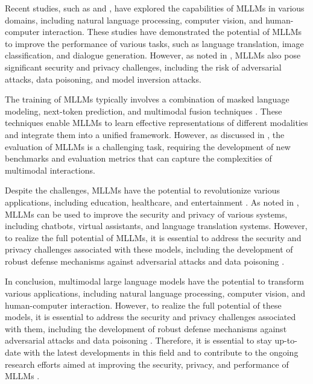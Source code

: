 \documentclass[11pt,a4paper]{article}
\begin{document}
Recent studies, such as \cite{doi:10.18653/v1/2023.acl-long.411} and \cite{arxiv:2401.13601}, have explored the capabilities of MLLMs in various domains, including natural language processing, computer vision, and human-computer interaction. These studies have demonstrated the potential of MLLMs to improve the performance of various tasks, such as language translation, image classification, and dialogue generation. However, as noted in \cite{doi:10.1145/3712001}, MLLMs also pose significant security and privacy challenges, including the risk of adversarial attacks, data poisoning, and model inversion attacks.

The training of MLLMs typically involves a combination of masked language modeling, next-token prediction, and multimodal fusion techniques \cite{arxiv:2403.03627}. These techniques enable MLLMs to learn effective representations of different modalities and integrate them into a unified framework. However, as discussed in \cite{arxiv:2408.08632}, the evaluation of MLLMs is a challenging task, requiring the development of new benchmarks and evaluation metrics that can capture the complexities of multimodal interactions.

Despite the challenges, MLLMs have the potential to revolutionize various applications, including education, healthcare, and entertainment \cite{arxiv:2402.00891}. As noted in \cite{doi:10.1145/3764113}, MLLMs can be used to improve the security and privacy of various systems, including chatbots, virtual assistants, and language translation systems. However, to realize the full potential of MLLMs, it is essential to address the security and privacy challenges associated with these models, including the development of robust defense mechanisms against adversarial attacks and data poisoning \cite{doi:10.1109/tnnls.2025.3592935}.

In conclusion, multimodal large language models have the potential to transform various applications, including natural language processing, computer vision, and human-computer interaction. However, to realize the full potential of these models, it is essential to address the security and privacy challenges associated with them, including the development of robust defense mechanisms against adversarial attacks and data poisoning \cite{arxiv:2409.18991}. Therefore, it is essential to stay up-to-date with the latest developments in this field and to contribute to the ongoing research efforts aimed at improving the security, privacy, and performance of MLLMs \cite{arxiv:2408.15769}.
\end{document}
